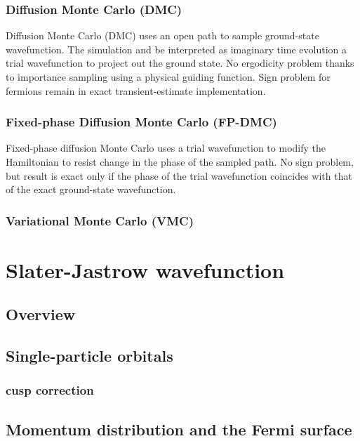 \documentclass[draftthesis,fullpage]{uiucthesis}
\begin{document}
\subsection{Diffusion Monte Carlo (DMC)}
Diffusion Monte Carlo (DMC) uses an open path to sample ground-state wavefunction. The simulation and be interpreted as imaginary time evolution a trial wavefunction to project out the ground state. No ergodicity problem thanks to importance sampling using a physical guiding function. Sign problem for fermions remain in exact transient-estimate implementation.

\subsection{Fixed-phase Diffusion Monte Carlo (FP-DMC)}
Fixed-phase diffusion Monte Carlo uses a trial wavefunction to modify the Hamiltonian to resist change in the phase of the sampled path. No sign problem, but result is exact only if the phase of the trial wavefunction coincides with that of the exact ground-state wavefunction.

\subsection{Variational Monte Carlo (VMC)}


\chapter{Slater-Jastrow wavefunction}
\section{Overview}
\section{Single-particle orbitals}
\subsection{cusp correction}
\section{Momentum distribution and the Fermi surface}
\end{document}
